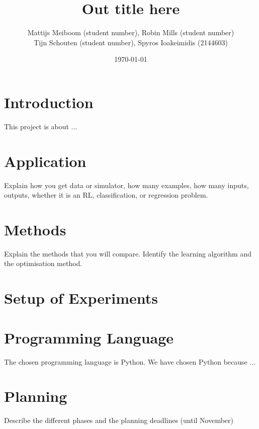 \documentclass[a4paper, 11pt]{scrartcl}
\title{\Large Out title here}
\author{\small Mattijs Meiboom (student number), Robin Mills (student number)\\
			\small Tijn Schouten (student number), Spyros Ioakeimidis (2144603)}
\date{\small \today}
\begin{document}
\maketitle

\thispagestyle{empty}

\section{Introduction}

This project is about ...

\section{Application}

Explain how you get data or simulator, how many examples, how many inputs, outputs, whether it is an RL, classification, or regression problem.

\section{Methods}

Explain the methods that you will compare. Identify the learning algorithm and the optimisation method.

\section{Setup of Experiments}

\section{Programming Language}

The chosen programming language is Python. We have chosen Python because ...

\section{Planning}

Describe the different phases and the planning deadlines (until November)
\end{document}
